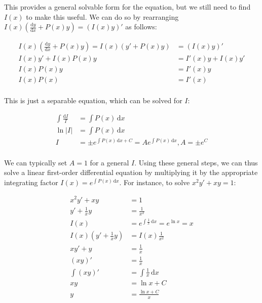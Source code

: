 \documentclass[12pt]{article}
\begin{document}
This provides a general solvable form for the equation, but we still need to find $I(x)$ to make this useful. We can do so by rearranging $I(x)(\frac{\text{d}y}{\text{d}x} + P(x)y) = (I(x)y)'$ as follows:

\begin{equation}
    \begin{split}
    I(x)(\frac{\text{d}y}{\text{d}x} + P(x)y) = I(x)(y'+P(x)y) &= (I(x)y)'\\
    I(x)y' + I(x)P(x)y &= I'(x)y+I(x)y'\\
    I(x)P(x)y &= I'(x)y\\
    I(x)P(x) &= I'(x)\\
    \end{split}
\end{equation}

This is just a separable equation, which can be solved for $I$:

\begin{equation}
    \begin{split}
        \int \frac{\text{d}I}{I} &= \int P(x) \,\text{d}x\\
        \ln |I| &= \int P(x) \,\text{d}x \\
        I  &= \pm e^{\int P(x)\,\text{d}x + C} = Ae^{\int P(x)\, \text{d}x}, A=\pm e^{C}\\
    \end{split}
\end{equation}

We can typically set $A=1$ for a general $I$. Using these general steps, we can thus solve a linear first-order differential equation by multiplying it by the appropriate integrating factor $I(x) = e^{\int P(x) \,\text{d}x}$. For instance, to solve $x^2y'+xy=1$:

\begin{equation}
    \begin{split}
        x^2y'+xy &= 1\\
        y' + \frac{1}{x}y &= \frac{1}{x^2}\\
        I(x) &= e^{\int \frac{1}{x} \,\text{d}x} = e^{\ln x} = x\\
        I(x)(y' + \frac{1}{x}y) &= I(x)\frac{1}{x^2}\\
        xy'+y &= \frac{1}{x}\\
        (xy)' &= \frac{1}{x}\\
        \int (xy)' &= \int \frac{1}{x} \,\text{d}x\\
        xy &= \ln x + C\\
        y &= \frac{\ln x + C}{x}\\
    \end{split}
\end{equation}
\end{document}
